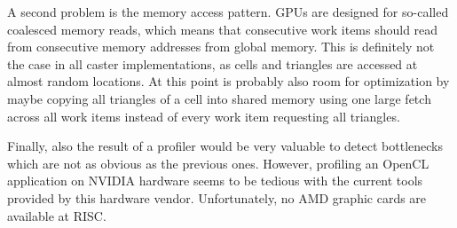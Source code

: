 A second problem is the memory access pattern. GPUs are designed for so-called coalesced memory reads, which means that consecutive work items should read from consecutive memory addresses from global memory. This is definitely not the case in all caster implementations, as cells and triangles are accessed at almost random locations. At this point is probably also room for optimization by maybe copying all triangles of a cell  into shared memory using one large fetch across all work items instead of every work item requesting all triangles.

Finally, also the result of a profiler would be very valuable to detect bottlenecks which are not as obvious as the previous ones. However, profiling an OpenCL application on NVIDIA hardware seems to be tedious with the current tools provided by this hardware vendor. Unfortunately, no AMD graphic cards are available at RISC.
